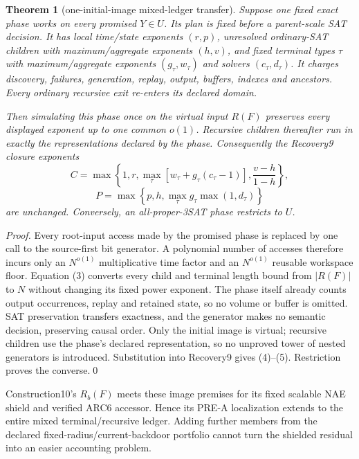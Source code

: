 \documentclass[11pt]{article}
\newtheorem{theorem}{Theorem}
\begin{document}
\begin{theorem}[one-initial-image mixed-ledger transfer]
Suppose one fixed exact phase works on every promised $Y\in U$.  Its plan is
fixed before a parent-scale SAT decision.  It has local time/state exponents
$(r,p)$, unresolved ordinary-SAT children with maximum/aggregate exponents
$(h,v)$, and fixed terminal types $\tau$ with maximum/aggregate exponents
$(g_\tau,w_\tau)$ and solvers $(c_\tau,d_\tau)$.  It charges discovery,
failures, generation, replay, output, buffers, indexes and ancestors.  Every
ordinary recursive exit re-enters its declared domain.

Then simulating this phase once on the virtual input $R(F)$ preserves every
displayed exponent up to one common $o(1)$.  Recursive children thereafter
run in exactly the representations declared by the phase.  Consequently the
Recovery9 closure exponents
\[
 C=\max\left\{1,r,
   \max_\tau[w_\tau+g_\tau(c_\tau-1)],
   \frac{v-h}{1-h}\right\},                           \tag{4}
\]
\[
 P=\max\left\{p,h,
   \max_\tau g_\tau\max(1,d_\tau)\right\}             \tag{5}
\]
are unchanged.  Conversely, an all-proper-3SAT phase restricts to $U$.
\end{theorem}

\begin{proof}
Every root-input access made by the promised phase is replaced by one call to
the source-first bit generator.  A polynomial number of accesses therefore
incurs only an $N^{o(1)}$ multiplicative time factor and an $N^{o(1)}$
reusable workspace floor.  Equation (3) converts every child and terminal
length bound from $|R(F)|$ to $N$ without changing its fixed power exponent.
The phase itself already counts output occurrences, replay and retained
state, so no volume or buffer is omitted.  SAT preservation transfers
exactness, and the generator makes no semantic decision, preserving causal
order.  Only the initial image is virtual; recursive children use the
phase's declared representation, so no unproved tower of nested generators
is introduced.  Substitution into Recovery9 gives (4)--(5).  Restriction
proves the converse.\qed
\end{proof}

Construction10's $R_b(F)$ meets these image premises for its fixed scalable
NAE shield and verified ARC6 accessor.  Hence its PRE-A localization extends
to the entire mixed terminal/recursive ledger.  Adding further members from
the declared fixed-radius/current-backdoor portfolio cannot turn the
shielded residual into an easier accounting problem.
\end{document}
